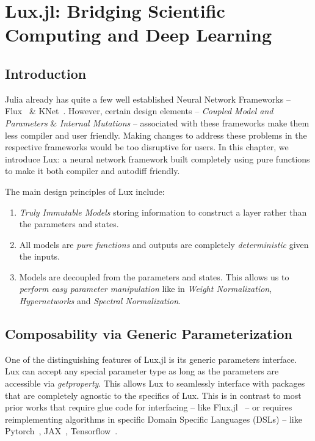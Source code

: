 \chapter{Lux.jl: Bridging Scientific Computing and Deep Learning}
\label{chapter:lux_bridging_scientific_computing_and_deep_learning}

\section{Introduction}
\label{sec:introduction_lux}

Julia already has quite a few well established Neural Network Frameworks – Flux~\citep{innes2018fashionable} \& KNet~\citep{yuret2016knet}. However, certain design elements – \textit{Coupled Model and Parameters} \& \textit{Internal Mutations} – associated with these frameworks make them less compiler and user friendly. Making changes to address these problems in the respective frameworks would be too disruptive for users. In this chapter, we introduce Lux: a neural network framework built completely using pure functions to make it both compiler and autodiff friendly.

The main design principles of Lux include:
%
\begin{enumerate}
  \item \textit{Truly Immutable Models} storing information to construct a layer rather than the parameters and states.
  \item All models are \textit{pure functions} and outputs are completely \textit{deterministic} given the inputs.
  \item Models are decoupled from the parameters and states. This allows us to \textit{perform easy parameter manipulation} like in \textit{Weight Normalization}, \textit{Hypernetworks} and \textit{Spectral Normalization}.
\end{enumerate}
%

\section{Composability via Generic Parameterization}
\label{sec:composability}

One of the distinguishing features of Lux.jl is its generic parameters interface. Lux can accept any special parameter type as long as the parameters are accessible via \textit{getproperty}. This allows Lux to seamlessly interface with packages that are completely agnostic to the specifics of Lux. This is in contrast to most prior works that require glue code for interfacing -- like Flux.jl~\citep{innes:2018} -- or requires reimplementing algorithms in specific Domain Specific Languages (DSLs) -- like Pytorch~\citep{paszke2019pytorch,paszke2017automatic}, JAX~\citep{jax2018github}, Tensorflow~\citep{tensorflow2015-whitepaper}.

